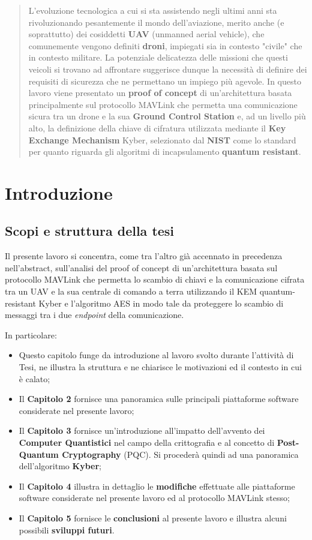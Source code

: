 \documentclass[a4paper, 12pt, oneside]{article}
\begin{document}
\begin{abstract}
    L'evoluzione tecnologica a cui si sta assistendo negli ultimi anni sta rivoluzionando pesantemente il mondo dell'aviazione, merito anche (e soprattutto) dei cosiddetti \textbf{UAV} (unmanned aerial vehicle), che comunemente vengono definiti \textbf{droni}, impiegati sia in contesto "civile" che in contesto militare. La potenziale delicatezza delle missioni che questi veicoli si trovano ad affrontare suggerisce dunque la necessità di definire dei requisiti di sicurezza che ne permettano un impiego più agevole. In questo lavoro viene presentato un \textbf{proof of concept} di un'architettura basata principalmente sul protocollo MAVLink che permetta una comunicazione sicura tra un drone e la sua \textbf{Ground Control Station} e, ad un livello più alto, la definizione della chiave di cifratura utilizzata mediante il \textbf{Key Exchange Mechanism} Kyber, selezionato dal \textbf{NIST} come lo standard per quanto riguarda gli algoritmi di incapsulamento \textbf{quantum resistant}.
\end{abstract}
\newpage

\section{Introduzione}

\subsection{Scopi e struttura della tesi}
Il presente lavoro si concentra, come tra l'altro già accennato in precedenza nell'abstract, sull'analisi del proof of concept di un'architettura basata sul protocollo MAVLink che permetta lo scambio di chiavi e la comunicazione cifrata tra un UAV e la sua centrale di comando a terra utilizzando il KEM quantum-resistant Kyber e l'algoritmo AES in modo tale da proteggere lo scambio di messaggi tra i due \textit{endpoint} della comunicazione.

In particolare:

\begin{itemize}
    \item Questo capitolo funge da introduzione al lavoro svolto durante l'attività di Tesi, ne illustra la struttura e ne chiarisce le motivazioni ed il contesto in cui è calato;
    \item Il \textbf{Capitolo 2} fornisce una panoramica sulle principali piattaforme software considerate nel presente lavoro;
    \item Il \textbf{Capitolo 3} fornisce un'introduzione all'impatto dell'avvento dei \textbf{Computer Quantistici} nel campo della crittografia e al concetto di \textbf{Post-Quantum Cryptography} (PQC). Si procederà quindi ad una panoramica dell'algoritmo \textbf{Kyber};
    \item Il \textbf{Capitolo 4} illustra in dettaglio le \textbf{modifiche} effettuate alle piattaforme software considerate nel presente lavoro ed al protocollo MAVLink stesso;
    \item Il \textbf{Capitolo 5} fornisce le \textbf{conclusioni} al presente lavoro e illustra alcuni possibili \textbf{sviluppi futuri}.
\end{itemize}
\end{document}
